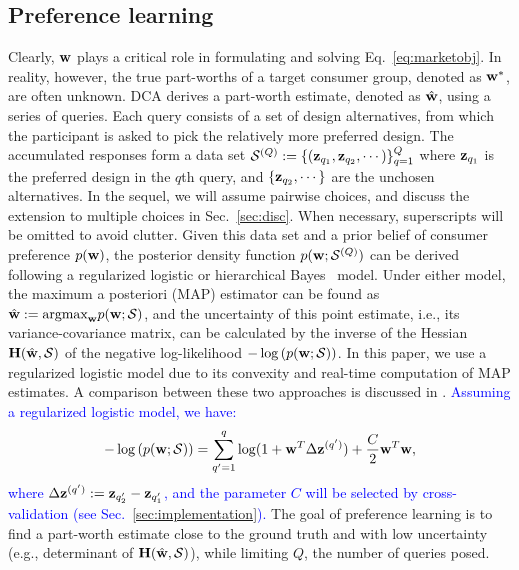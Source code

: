 \documentclass[onecolumn,11pt]{article}
\newcommand{\highlight}[1]{{\textcolor{blue}{{#1}}}}
\newcommand{\highlight}[1]{{{#1}}}
\newcommand{\cutsubsectionup}{\vspace*{-0.09in}}
\newcommand{\cutsubsectionup}{}
\begin{document}
\cutsubsectionup
\subsection{Preference learning}
\label{sec:preferencelearning}
Clearly, ${\bf w}$ plays a critical role in formulating and solving Eq.~\eqref{eq:marketobj}. In reality, however, the true part-worths of a target consumer group, denoted as ${\bf w}^*$, are often unknown. DCA derives a part-worth estimate, denoted as $\hat{\bf w}$, using a series of queries. Each query consists of a set of design alternatives, from which the participant is asked to pick the relatively more preferred design. The accumulated responses form a data set $\mathcal{S}^{(Q)}:=\{({\bf z}_{q_1},{\bf z}_{q_2},\cdots)\}_{q=1}^{Q}$ where ${\bf z}_{q_1}$ is the preferred design in the $q$th query, and $\{{\bf z}_{q_2},\cdots\}$ are the unchosen alternatives. In the sequel, we will assume pairwise choices, and discuss the extension to multiple choices in Sec.~\ref{sec:disc}. When necessary, superscripts will be omitted to avoid clutter. Given this data set and a prior belief of consumer preference $p({\bf w})$, the posterior density function $p({\bf w};\mathcal{S}^{(Q)})$ can be derived following a regularized logistic or hierarchical Bayes~\cite{lenk1996hierarchical,rossi2003bayesian} model. Under either model, the maximum a posteriori (MAP) estimator can be found as $\hat{\bf w}:=\text{argmax}_{{\bf w}} p({\bf w};\mathcal{S})$, and the uncertainty of this point estimate, i.e., its variance-covariance matrix, can be calculated by the inverse of the Hessian ${\bf H}(\hat{\bf w},\mathcal{S})$ of the negative log-likelihood $-\log\left(p({\bf w};\mathcal{S})\right)$. In this paper, we use a regularized logistic model due to its convexity and real-time computation of MAP estimates. A comparison between these two approaches is discussed in \cite{toubia200712}. \highlight{Assuming a regularized logistic model, we have:
\begin{equation}
-\log\left(p({\bf w};\mathcal{S})\right) = \sum_{q'=1}^{q}\log (1+{\bf w}^T \Delta {\bf z}^{(q')}) + \frac{C}{2}{\bf w}^T{\bf w},
\label{eq:nll}
\end{equation}
where $\Delta {\bf z}^{(q')}:= {\bf z}_{q'_2} - {\bf z}_{q'_1}$, and the parameter $C$ will be selected by cross-validation (see Sec.~\ref{sec:implementation}).} The goal of preference learning is to find a part-worth estimate close to the ground truth and with low uncertainty (e.g., determinant of ${\bf H}(\hat{\bf w},\mathcal{S})$), while limiting $Q$, the number of queries posed.
\end{document}
